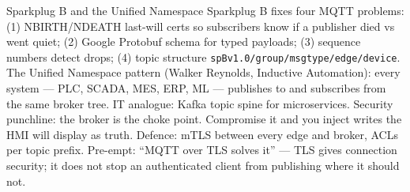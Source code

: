 \documentclass[aspectratio=169,11pt]{beamer}
\begin{document}
\begin{frame}{Sparkplug B and the Unified Namespace}
{  Sparkplug B fixes four MQTT problems: (1) NBIRTH/NDEATH last-will certs so subscribers know if a publisher died vs went quiet; (2) Google Protobuf schema for typed payloads; (3) sequence numbers detect drops; (4) topic structure \texttt{spBv1.0/group/msgtype/edge/device}. The Unified Namespace pattern (Walker Reynolds, Inductive Automation): every system --- PLC, SCADA, MES, ERP, ML --- publishes to and subscribes from the same broker tree. IT analogue: Kafka topic spine for microservices. Security punchline: the broker is the choke point. Compromise it and you inject writes the HMI will display as truth. Defence: mTLS between every edge and broker, ACLs per topic prefix. Pre-empt: ``MQTT over TLS solves it'' --- TLS gives connection security; it does not stop an authenticated client from publishing where it should not.
}
\end{frame}
\end{document}

